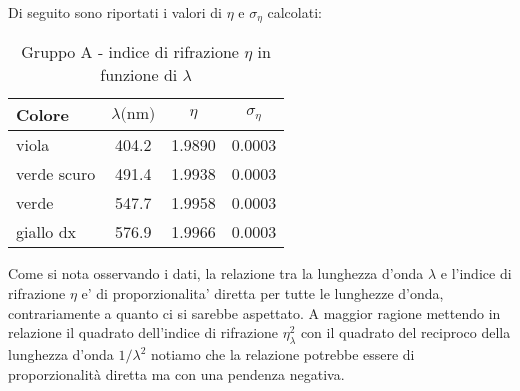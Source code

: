 Di seguito sono riportati i valori di $\eta$ e $\sigma_{\eta}$ calcolati:
\begin{table}[!htbp]
    {\par\centering
    \begin{tabular}{lccc}
        \hline
            Colore &
            $\lambda \text{(nm)}$ & 
            $\eta$ & 
            $\sigma_{\eta}$ \\
        \hline
        viola       &   404.2   &   1.9890 &   0.0003 \\
        verde scuro &   491.4   &   1.9938 &   0.0003 \\
        verde       &   547.7   &   1.9958 &   0.0003 \\
        giallo dx   &   576.9   &   1.9966 &   0.0003 \\
        \hline
    \end{tabular}
    \par}
    \caption{Gruppo A - indice di rifrazione $\eta$ in funzione di $\lambda$}
\end{table}

Come si nota osservando i dati, la relazione tra la lunghezza d'onda $\lambda$ e l'indice di rifrazione $\eta$ e' di proporzionalita' diretta per tutte le lunghezze d'onda, contrariamente a quanto ci si sarebbe aspettato.
A maggior ragione mettendo in relazione il quadrato dell'indice di rifrazione $\eta_{\lambda}^2$ con il quadrato del reciproco della lunghezza d'onda $1/\lambda^2$ notiamo che la relazione potrebbe essere di proporzionalità diretta ma con una pendenza negativa.

\begin{center}
\end{center}


